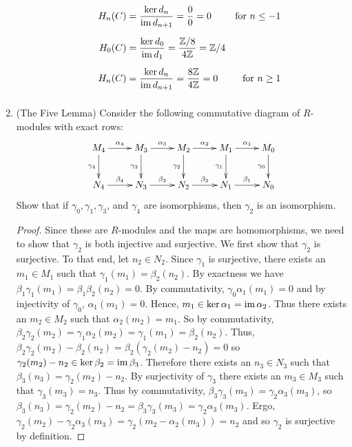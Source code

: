 \documentclass[11pt,oneside,english]{amsart}
\theoremstyle{definition}
\newcommand{\MB}[1]{\mathbb{#1}}
\newcommand{\im}{\text{im\,}}
\begin{document}
\begin{enumerate}[leftmargin=*]
\begin{enumerate}


\begin{align*}
H_n(C)&=\frac{\ker d_{n}}{\im d_{n+1}}=\frac{0}{0}=0 & \text{for $n\leq -1$}\\[2mm]
H_0(C)&=\frac{\ker d_0}{\im d_1}=\frac{\MB{Z}/8}{4\MB{Z}}=\MB{Z}/4\\[2mm]
H_n(C)&=\frac{\ker d_{n}}{\im d_{n+1}}=\frac{8\MB{Z}}{4\MB{Z}}=0 & \text{for $n\geq 1$}\\[2mm]
\end{align*}
\end{enumerate}


\pagebreak


\item (The Five Lemma) Consider the following commutative diagram of $R$-modules with exact rows:
\[
\xymatrix{M_4 \ar[d]_-{\gamma_4} \ar[r]^{\alpha_4} & M_3 \ar[r]^{\alpha_3} \ar[d]_-{\gamma_3} & M_2 \ar[r]^{\alpha_2} \ar[d]_-{\gamma_2} & M_1 \ar[d]_-{\gamma_1} \ar[r]^{\alpha_1} & M_0 \ar[d]_-{\gamma_0} \\
N_4 \ar[r]^{\beta_4} & N_3 \ar[r]^{\beta_3} & N_2 \ar[r]^{\beta_2} & N_1 \ar[r]^{\beta_1} & N_0}
\]
Show that if $\gamma_0, \gamma_1, \gamma_3$, and $\gamma_4$ are isomorphisms, then $\gamma_2$ is an isomorphism.

{\linespread{1.6}
\begin{proof}
Since these are $R$-modules and the maps are homomorphisms, we need to show that $\gamma_2$ is both injective and surjective. We first show that $\gamma_2$ is surjective. To that end, let $n_{2}\in N_{2}$. Since $\gamma_{1}$ is surjective, there exists an $m_{1}\in M_{1}$ such that $\gamma_{1}(m_{1})=\beta_{2}(n_{2})$. By exactness we have $\beta_{1}\gamma_{1}(m_{1})=\beta_{1}\beta_{2}(n_{2})=0$. By commutativity, $\gamma_{0}\alpha_{1}(m_{1})=0$ and by injectivity of $\gamma_{0}$, $\alpha_{1}(m_{1})=0$. Hence, $m_{1}\in\ker\alpha_{1}=\im\alpha_{2}$. Thus there exists an $m_{2}\in M_{2}$ such that $\alpha_{2}(m_{2})=m_{1}$. So by commutativity, $\beta_{2}\gamma_{2}(m_{2})=\gamma_{1}\alpha_{2}(m_{2})=\gamma_{1}(m_{1})=\beta_{2}(n_{2})$. Thus, $\beta_{2}\gamma_{2}(m_{2})-\beta_{2}(n_{2})=\beta_{2}(\gamma_{2}(m_{2})-n_{2})=0$ so $\gamma_{2}(m_{2})-n_{2}\in\ker\beta_{2}=\im\beta_{3}$. Therefore there exists an $n_{3}\in N_{3}$ such that $\beta_{3}(n_{3})=\gamma_{2}(m_{2})-n_{2}$. By surjectivity of $\gamma_{3}$ there exists an $m_{3}\in M_{3}$ such that $\gamma_{3}(m_{3})=n_{3}$. Thus by commutativity, $\beta_{3}\gamma_{3}(m_{3})=\gamma_{2}\alpha_{3}(m_{3})$, so $\beta_{3}(n_{3})=\gamma_{2}(m_{2})-n_{2}=\beta_{3}\gamma_{3}(m_{3})=\gamma_{2}\alpha_{3}(m_{3})$. Ergo, $\gamma_{2}(m_{2})-\gamma_{2}\alpha_{3}(m_{3})=\gamma_{2}(m_{2}-\alpha_{2}(m_{3}))=n_{2}$ and so $\gamma_{2}$ is surjective by definition.


\end{proof}}
\end{enumerate}
\end{document}
